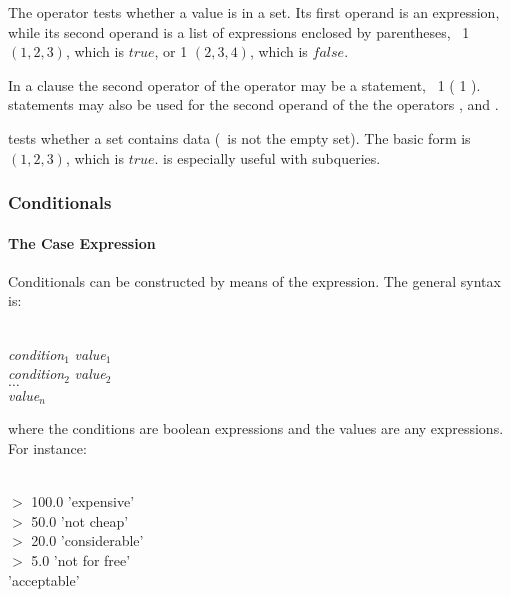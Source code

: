 The operator  tests
whether a value is in a set.
Its first operand is an expression,
while its second operand is a list
of expressions enclosed by parentheses,
\eg\ 1  $(1,2,3)$,
which is $true$, or
1  $(2,3,4)$,
which is $false$.

In a  clause
the second operator of the  operator
may be a  statement, \eg\
1 
( 1  ).
\acronym{dql} statements may also be used
for the second operand of the the operators
,  and .

 tests whether a set contains
data (\ie\ is not the empty set).
The basic form is  $(1,2,3)$,
which is $true$.
 is especially useful with subqueries.

\subsubsection{Conditionals}
\paragraph{The Case Expression}
Conditionals can be constructed by means
of the  expression.
The general syntax is:

\\
\hspace*{1cm} \textit{condition$_1$} 
 \textit{value$_1$} \\
\hspace*{1cm} \textit{condition$_2$} 
\keyword{then} \textit{value$_2$} \\
\hspace*{1cm} $\dots$\\
\hspace*{1cm} \textit{value$_n$} \\

where the conditions are boolean expressions
and the values are any expressions.
For instance:

\\
\hspace*{1cm}  $>$ 100.0
 'expensive' \\
\hspace*{1cm}  $>$ 50.0
 'not cheap' \\
\hspace*{1cm}  $>$ 20.0
 'considerable' \\
\hspace*{1cm}  $>$ 5.0
\keyword{then} 'not for free' \\
\hspace*{1cm} 'acceptable' \\

